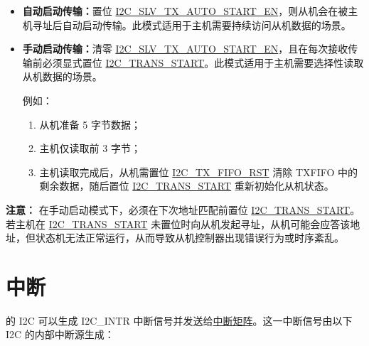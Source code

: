 \documentclass[main\_\_CN.tex]{subfiles}
\begin{document}
\begin{itemize}
    \item \textbf{自动启动传输：}置位 \hyperref[fielddesc:I2CSLVTXAUTOSTARTEN]{I2C\_SLV\_TX\_AUTO\_START\_EN}，则从机会在被主机寻址后自动启动传输。此模式适用于主机需要持续访问从机数据的场景。
    \item \textbf{手动启动传输：}清零 \hyperref[fielddesc:I2CSLVTXAUTOSTARTEN]{I2C\_SLV\_TX\_AUTO\_START\_EN}，且在每次接收传输前必须显式置位 \hyperref[fielddesc:I2CTRANSSTART]{I2C\_TRANS\_START}。此模式适用于主机需要选择性读取从机数据的场景。

例如：
\begin{enumerate}
\item 从机准备 5 字节数据；
\item 主机仅读取前 3 字节；
\item 主机读取完成后，从机需置位 \hyperref[fielddesc:I2CTXFIFORST]{I2C\_TX\_FIFO\_RST} 清除 TXFIFO 中的剩余数据，随后置位 \hyperref[fielddesc:I2CTRANSSTART]{I2C\_TRANS\_START} 重新初始化从机状态。
\end{enumerate}

\end{itemize}

{\bfseries 注意：}
在手动启动模式下，必须在下次地址匹配前置位 \hyperref[fielddesc:I2CTRANSSTART]{I2C\_TRANS\_START}。
若主机在 \hyperref[fielddesc:I2CTRANSSTART]{I2C\_TRANS\_START} 未置位时向从机发起寻址，从机可能会应答该地址，但状态机无法正常运行，从而导致从机控制器出现错误行为或时序紊乱。


\section{中断}
\label{sub:i2c-int}

\chipname{} 的 I2C 可以生成 I2C\_INTR 中断信号并发送给\hyperref[mod:intmtrx]{中断矩阵}。这一中断信号由以下 I2C 的内部中断源生成：
\end{document}

